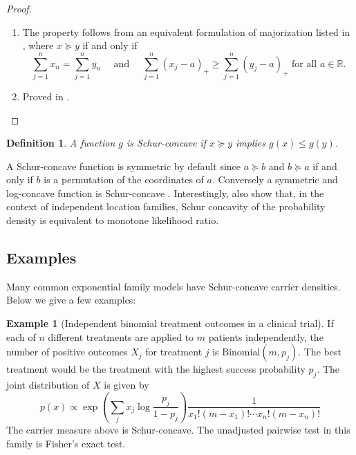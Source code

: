 \documentclass[aos, authoryear]{imsart}
\newtheorem{definition}{Definition}
\theoremstyle{definition}
\newtheorem{example}{Example}
\theoremstyle{custom}
\newcommand{\RR}{\mathbb{R}}
\begin{document}
\begin{proof}\leavevmode
\begin{enumerate}
\item The property follows from an equivalent formulation of majorization listed in \citet{Marshall:2010hb}, where $x \succeq y$ if and only if
\[\sum_{j=1}^n x_n = \sum_{j=1}^n y_n \quad \text{ and } \quad \sum_{j=1}^n \left(x_j - a\right)_+ \ge \sum_{j=1}^n \left(y_j - a\right)_+ \text{ for all } a \in \RR.\]

\item Proved in \citet{Marshall:2010hb}. \qedhere
\end{enumerate}
\end{proof}

\begin{definition}
A function $g$ is Schur-concave if $x \succeq y$ implies $g\left(x\right) \le g\left(y\right)$.
\end{definition}

A Schur-concave function is symmetric by default since $a \succeq b$ and $b \succeq a$ if and only if $b$ is a permutation of the coordinates of $a$. Conversely a symmetric and log-concave function is Schur-concave \citep{Marshall:2010hb}. Interestingly, \citet{Gupta:1984fw} also show that, in the context of independent location families, Schur concavity of the probability density is equivalent to monotone likelihood ratio.

\subsection{Examples}

Many common exponential family models have Schur-concave carrier densities. Below we give a few examples:

\begin{example}[Independent binomial treatment outcomes in a clinical trial]
 If each of $n$ different treatments are applied to $m$ patients independently, the number of positive outcomes $X_j$ for treatment $j$ is $\text{Binomial}\left(m, p_j\right)$. The best treatment would be the treatment with the highest success probability $p_j$. The joint distribution of $X$ is given by
\[p\left(x\right) \propto \exp\left(\sum_j x_j \log\frac{p_j}{1-p_j}\right) \frac{1}{x_1! \left(m-x_1\right)! \cdots x_n! \left(m-x_n\right)!}\]
The carrier measure above is Schur-concave. The unadjusted pairwise test in this family is Fisher's exact test.
\end{example}
\end{document}
